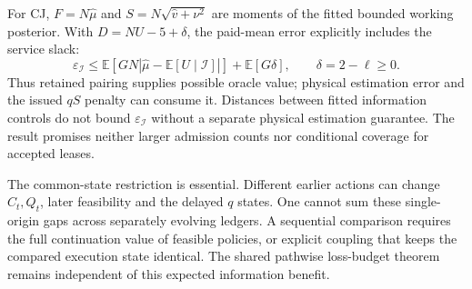 For CJ, $F=N\widehat\mu$ and
$S=N\sqrt{\widehat v+\nu^2}$ are moments of the fitted bounded working
posterior.  With $D=NU-5+\delta$, the paid-mean error explicitly includes
the service slack:
\begin{equation}
 \varepsilon_{\mathcal I}
 \leq\mathbb E\!\left[GN
     |\widehat\mu-\mathbb E[U\mid\mathcal I]|\right]
     +\mathbb E[G\delta],\qquad \delta=2-\ell\geq0.
 \label{eq:final-paid-target-error}
\end{equation}
Thus retained pairing supplies possible oracle value; physical estimation
error and the issued $qS$ penalty can consume it.  Distances between fitted
information controls do not bound $\varepsilon_{\mathcal I}$ without a
separate physical estimation guarantee.  The result promises neither
larger admission counts nor conditional coverage for accepted leases.

The common-state restriction is essential.  Different earlier actions can
change $C_t,Q_t$, later feasibility and the delayed $q$ states.  One cannot
sum these single-origin gaps across separately evolving ledgers.  A
sequential comparison requires the full continuation value of feasible
policies, or explicit coupling that keeps the compared execution state
identical.  The shared pathwise loss-budget theorem remains independent of
this expected information benefit.
